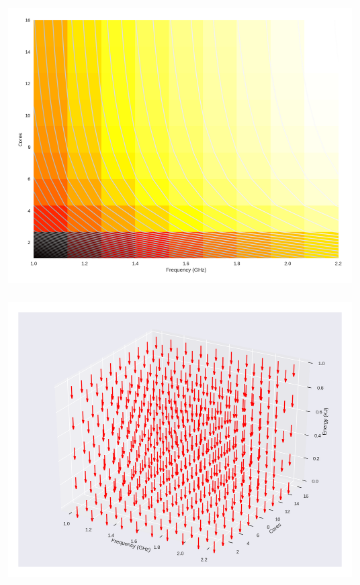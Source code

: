 \begin{figure}[H]
	\centering
	\begin{subfigure}[b]{0.45\textwidth}
		\includegraphics[width=\textwidth]{models/figures/analisys/pstatic3000.png}
	\end{subfigure}
	\begin{subfigure}[b]{0.45\textwidth}
		\includegraphics[width=\textwidth]{models/figures/analisys/pstatic3000_3d.png}
	\end{subfigure}
\end{figure}

